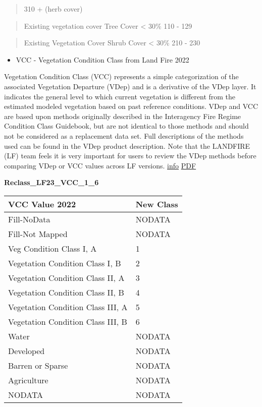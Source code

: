 \documentclass[
]{agujournal2019}
\providecommand{\tightlist}{%
  \setlength{\itemsep}{0pt}\setlength{\parskip}{0pt}}\usepackage{longtable,booktabs,array}
\begin{document}
\begin{quote}
310 + (herb cover)
\end{quote}

\begin{quote}
Existing vegetation cover Tree Cover \textless{} 30\% 110 - 129
\end{quote}

\begin{quote}
Existing Vegetation Cover Shrub Cover \textless{} 30\% 210 - 230
\end{quote}

\begin{itemize}
\tightlist
\item
  VCC - Vegetation Condition Class from Land Fire 2022
\end{itemize}

Vegetation Condition Class (VCC) represents a simple categorization of
the associated Vegetation Departure (VDep) and is a derivative of the
VDep layer. It indicates the general level to which current vegetation
is different from the estimated modeled vegetation based on past
reference conditions. VDep and VCC are based upon methods originally
described in the Interagency Fire Regime Condition Class Guidebook, but
are not identical to those methods and should not be considered as a
replacement data set. Full descriptions of the methods used can be found
in the VDep product description. Note that the LANDFIRE (LF) team feels
it is very important for users to review the VDep methods before
comparing VDep or VCC values across LF versions.
\href{https://www.landfire.gov/vegetation/vcc}{info}
\href{chrome-extension://efaidnbmnnnibpcajpcglclefindmkaj/https://www.landfire.gov/sites/default/files/DataDictionary/LF2022/LF22_VCCADD_230.pdf}{PDF}

\textbf{Reclass\_LF23\_VCC\_1\_6}

\begin{longtable}[]{@{}ll@{}}
\toprule\noalign{}
VCC Value 2022 & New Class \\
\midrule\noalign{}
\endhead
\bottomrule\noalign{}
\endlastfoot
Fill-NoData & NODATA \\
Fill-Not Mapped & NODATA \\
Veg Condition Class I, A & 1 \\
Vegetation Condition Class I, B & 2 \\
Vegetation Condition Class II, A & 3 \\
Vegetation Condition Class II, B & 4 \\
Vegetation Condition Class III, A & 5 \\
Vegetation Condition Class III, B & 6 \\
Water & NODATA \\
Developed & NODATA \\
Barren or Sparse & NODATA \\
Agriculture & NODATA \\
NODATA & NODATA \\
\end{longtable}
\end{document}
